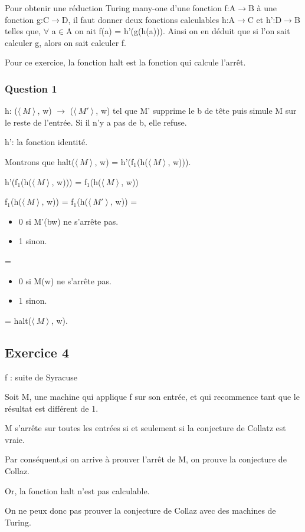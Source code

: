 Pour obtenir une réduction Turing many-one d’une fonction
f:A$\rightarrow$B \`a une fonction g:C$\rightarrow$D,
il faut donner deux fonctions calculables h:A$\rightarrow$C
et h':D$\rightarrow$B telles que, $\forall$ a$\in$A on ait
f(a) = h'(g(h(a))). 
Ainsi on en déduit que si l’on sait calculer g,
alors on sait calculer f.

Pour ce exercice, la fonction halt est la fonction qui
calcule l'arr\^et.

\subsubsection{Question 1}

h: ($\langle\ M\ \rangle \!\ $, w) $\rightarrow$
($\langle\ M'\ \rangle \!\ $, w) tel que M' supprime le b
de t\^ete puis simule M sur le reste de l'entr\'ee.
Si il n'y a pas de b, elle refuse.

h': la fonction identit\'e.

Montrons que halt($\langle\ M\ \rangle \!\ $, w) =
h'(f$_1$(h($\langle\ M\ \rangle \!\ $, w))).

h'(f$_1$(h($\langle\ M\ \rangle \!\ $, w))) =
f$_1$(h($\langle\ M\ \rangle \!\ $, w))

f$_1$(h($\langle\ M\ \rangle \!\ $, w)) =
f$_1$(h($\langle\ M'\ \rangle \!\ $, w)) =
\begin{itemize}
  \item[] 0 si M'(bw) ne s'arr\^ete pas.
  \item[] 1 sinon.
\end{itemize}

=
\begin{itemize}
  \item[] 0 si M(w) ne s'arr\^ete pas.
  \item[] 1 sinon.
\end{itemize}

= halt($\langle\ M\ \rangle \!\ $, w).


\subsection{Exercice 4}

f : suite de Syracuse

Soit M, une machine qui applique f sur son entr\'ee, et
qui recommence tant que le r\'esultat est diff\'erent de 1.

M s'arr\^ete sur toutes les entr\'ees si et seulement si
la conjecture de Collatz est vraie.

Par cons\'equent,si on arrive \`a prouver l'arr\^et de M,
on prouve la conjecture de Collaz.

Or, la fonction halt n'est pas calculable.

On ne peux donc pas prouver la conjecture de Collaz avec
des machines de Turing.
